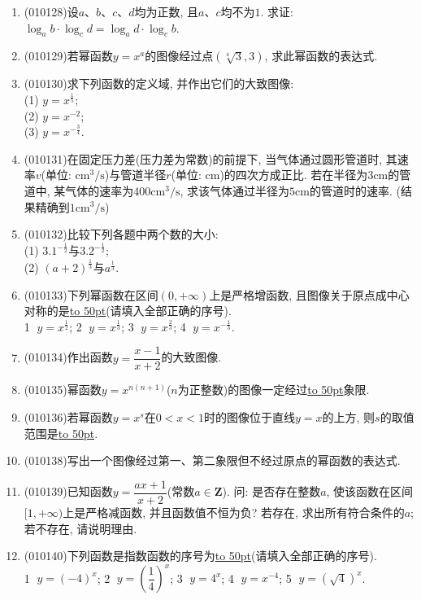 \documentclass[10pt,a4paper]{article}
\newcommand{\blank}[1]{\underline{\hbox to #1pt{}}}
\begin{document}
\begin{enumerate}[1.]
\item {\tiny (010128)}设$a$、$b$、$c$、$d$均为正数, 且$a$、$c$均不为$1$. 求证:
$\log_ab\cdot \log_cd=\log_ad\cdot \log_cb$.
\item {\tiny (010129)}若幂函数$y=x^a$的图像经过点$(\sqrt[4]{3}, 3)$, 求此幂函数的表达式.
\item {\tiny (010130)}求下列函数的定义域, 并作出它们的大致图像:\\
(1) $y=x^\frac 15$;\\
(2) $y=x^{-2}$;\\
(3) $y=x^{-\frac 34}$.
\item {\tiny (010131)}在固定压力差(压力差为常数)的前提下, 当气体通过圆形管道时, 其速率$v$(单位: $\text{cm}^3/\text{s}$)与管道半径$r$(单位: $\text{cm}$)的四次方成正比. 若在半径为$3\text{cm}$的管道中, 某气体的速率为$400\text{cm}^3/\text{s}$, 求该气体通过半径为$5\text{cm}$的管道时的速率. (结果精确到$1\text{cm}^3/\text{s}$)
\item {\tiny (010132)}比较下列各题中两个数的大小:\\
(1) $3.1^{-\frac 12}$与$3.2^{-\frac 12}$;\\
(2) $(a+2)^{\frac 13}$与$a^{\frac 13}$.
\item {\tiny (010133)}下列幂函数在区间$(0, +\infty)$上是严格增函数, 且图像关于原点成中心对称的是\blank{50}(请填入全部正确的序号).\\
\textcircled{1} $y=x^\frac 12$; \textcircled{2} $y=x^\frac 13$; \textcircled{3} $y=x^\frac 23$; \textcircled{4} $y=x^{-\frac 13}$.
\item {\tiny (010134)}作出函数$y=\dfrac{x-1}{x+2}$的大致图像.
\item {\tiny (010135)}幂函数$y=x^{n(n+1)}$($n$为正整数)的图像一定经过\blank{50}象限.
\item {\tiny (010136)}若幂函数$y=x^s$在$0<x<1$时的图像位于直线$y=x$的上方, 则$s$的取值范围是\blank{50}.
\item {\tiny (010138)}写出一个图像经过第一、第二象限但不经过原点的幂函数的表达式.
\item {\tiny (010139)}已知函数$y=\dfrac{ax+1}{x+2}$(常数$a\in \mathbf{Z}$). 问: 是否存在整数$a$, 使该函数在区间$[1, +\infty)$上是严格减函数, 并且函数值不恒为负?  若存在, 求出所有符合条件的$a$; 若不存在, 请说明理由.
\item {\tiny (010140)}下列函数是指数函数的序号为\blank{50}(请填入全部正确的序号).\\
\textcircled{1} $y=(-4)^x$; \textcircled{2} $y=(\dfrac 14)^x$; \textcircled{3} $y=4^x$; \textcircled{4} $y=x^{-4}$; \textcircled{5} $y=(\sqrt 4)^x$.

\end{enumerate}
\end{document}

